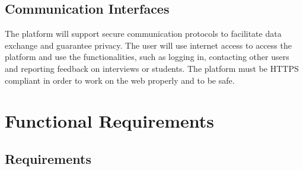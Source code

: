 \subsection{Communication Interfaces}
\label{subsec:communication_interfaces}%
The platform will support secure communication protocols to facilitate data exchange and guarantee privacy.  The user will use internet access to access the platform and use the functionalities, such as logging in, contacting other users and reporting feedback on interviews or students. The platform must be HTTPS compliant in order to work on the web properly and to be safe. 
 
\section{Functional Requirements}
\label{sec:functional_requirements}%

\subsection{Requirements}
\label{subsec: requirements}%
\setcounter{h}{0}
\newcommand{\ch}{\stepcounter{h}R\theh}

